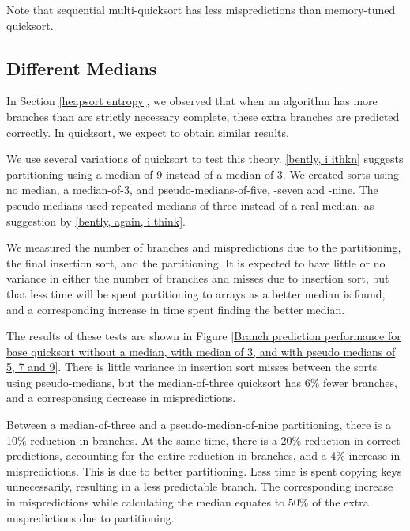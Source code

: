 Note that sequential multi-quicksort has less mispredictions than memory-tuned quicksort.


\subsection{Different Medians}

\label{quick-predictors2}

\label{quicksort entropy}

In Section \ref{heapsort entropy}, we observed that when an algorithm has more
branches than are strictly necessary complete, these extra branches are
predicted correctly. In quicksort, we expect to obtain similar results.


We use several variations of quicksort to test this theory. \ref{bently, i
ithkn} suggests partitioning using a median-of-9 instead of a median-of-3. We
created sorts using no median, a median-of-3, and pseudo-medians-of-five, -seven and
-nine. The pseudo-medians used repeated medians-of-three instead of a real
median, as suggestion by \ref{bently, again, i think}. 

We measured the number of branches and mispredictions due to the partitioning,
the final insertion sort, and the partitioning. It is expected to have little or
no variance in either the number of branches and misses due to insertion sort,
but that less time will be spent partitioning to arrays as a better median is
found, and a corresponding increase in time spent finding the better median.

The results of these tests are shown in Figure \ref{Branch prediction
performance for base quicksort without a median, with median of 3, and with
pseudo medians of 5, 7 and 9}. There is little variance in insertion sort misses
between the sorts using pseudo-medians, but the median-of-three quicksort has
6\% fewer branches, and a corresponsing decrease in mispredictions.

Between a median-of-three and a pseudo-median-of-nine partitioning, there is a
10\% reduction in branches. At the same time, there is a 20\% reduction in
correct predictions, accounting for the entire reduction in branches, and a 4\%
increase in mispredictions. This is due to better partitioning. Less time is
spent copying keys unnecessarily, resulting in a less predictable branch. The
corresponding increase in mispredictions while calculating the median equates to
50\% of the extra mispredictions due to partitioning.

